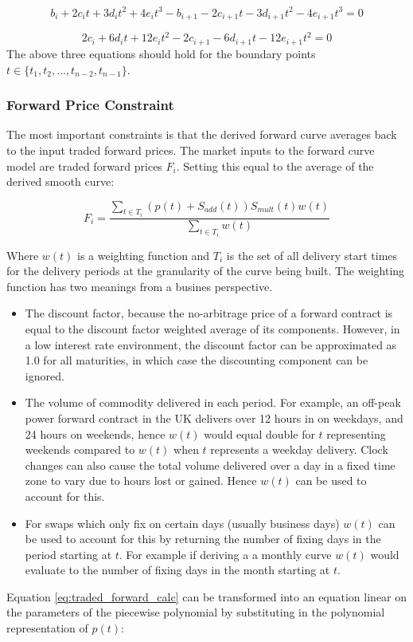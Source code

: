 \documentclass{article}
\begin{document}
\begin{equation}
    \label{eq:1st_deriv_constraint}
    b_i + 2 c_i t + 3 d_i t^2 + 4 e_i t^3 - 
    b_{i+1} - 2 c_{i+1} t - 3 d_{i+1} t^2 - 4 e_{i+1} t^3 = 0
\end{equation}

\begin{equation}
    \label{eq:2nd_deriv_constraint}
    2 c_i + 6 d_i t + 12 e_i t^2 - 
    2 c_{i+1} - 6 d_{i+1} t - 12 e_{i+1} t^2 = 0
\end{equation}
The above three equations should hold for the boundary points \\
$t \in \{t_1, t_2, \hdots, t_{n-2}, t_{n-1}\}$.

\subsubsection{Forward Price Constraint}
The most important constraints is that the derived forward curve averages back to the 
input traded forward prices.
The market inputs to the forward curve model are traded forward prices $F_i$.
Setting this equal to the average of the derived smooth curve:

\begin{equation}
    \label{eq:traded_forward_calc}
    F_i = \frac{\sum_{t \in T_i} (p(t) + S_{add}(t))S_{mult}(t)w(t)}
    {\sum_{t \in T_i} w(t)}
\end{equation}

Where $w(t)$ is a weighting function and $T_i$ is the set of all delivery start times
for the delivery periods at the granularity of the curve being built. The weighting function has two
meanings from a busines perspective.
\begin{itemize}
    \item The discount factor, because the no-arbitrage price of a forward contract is equal 
    to the discount factor weighted average of its components. However, in a low interest rate 
    environment, the discount factor can be approximated as 1.0 for all maturities, in which case 
    the discounting component can be ignored.
    \item The volume of commodity delivered in each period. For example, an off-peak power forward 
    contract in the UK delivers over 12 hours in on weekdays, and 24 hours on weekends, hence $w(t)$ 
    would equal double for $t$ representing weekends compared to $w(t)$ when $t$ represents a weekday delivery. 
    Clock changes can also cause the total volume delivered over a day in a fixed time zone to vary 
    due to hours lost or gained. Hence $w(t)$ can be used to account for this.
    \item For swaps which only fix on certain days (usually business days) $w(t)$ can be used to account 
    for this by returning the number of fixing days in the period starting at $t$.
    For example if deriving a a monthly curve $w(t)$ would evaluate to the number of fixing days in the 
    month starting at $t$.
\end{itemize}
Equation \ref{eq:traded_forward_calc} can be transformed into an equation linear on the parameters of the piecewise polynomial by substituting
in the polynomial representation of $p(t)$:
\end{document}
